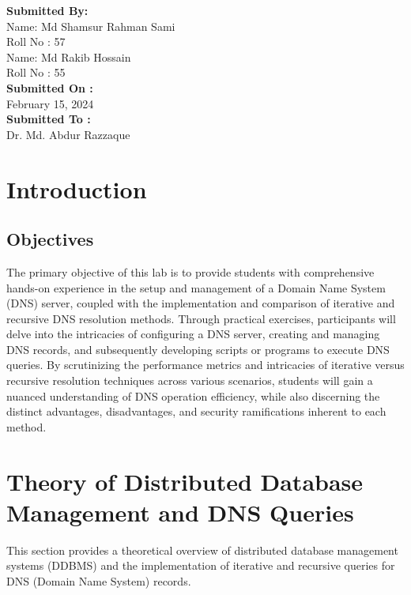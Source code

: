 \documentclass[11pt]{article}
\begin{document}
\begin{titlepage}
\begin{large}
        \textbf{Submitted By:\\[12pt]}
            Name: Md Shamsur Rahman Sami\\[5pt]
            Roll No : 57\\[7pt]
            Name: Md Rakib Hossain\\[5pt]
            Roll No : 55\\[12pt]
        \textbf{Submitted On : \\[12pt]}
            February 15, 2024\\[20pt]
        \textbf{Submitted To :\\[12pt]}
            Dr. Md. Abdur Razzaque\\[12pt]
    \end{large}
\end{titlepage}

\tableofcontents  

\newpage

\section{Introduction}
\subsection{Objectives}

The primary objective of this lab is to provide students with comprehensive hands-on experience in the setup and management of a Domain Name System (DNS) server, coupled with the implementation and comparison of iterative and recursive DNS resolution methods. Through practical exercises, participants will delve into the intricacies of configuring a DNS server, creating and managing DNS records, and subsequently developing scripts or programs to execute DNS queries. By scrutinizing the performance metrics and intricacies of iterative versus recursive resolution techniques across various scenarios, students will gain a nuanced understanding of DNS operation efficiency, while also discerning the distinct advantages, disadvantages, and security ramifications inherent to each method.

\section{Theory of Distributed Database Management and DNS Queries}

This section provides a theoretical overview of distributed database management systems (DDBMS) and the implementation of iterative and recursive queries for DNS (Domain Name System) records.
\end{document}
